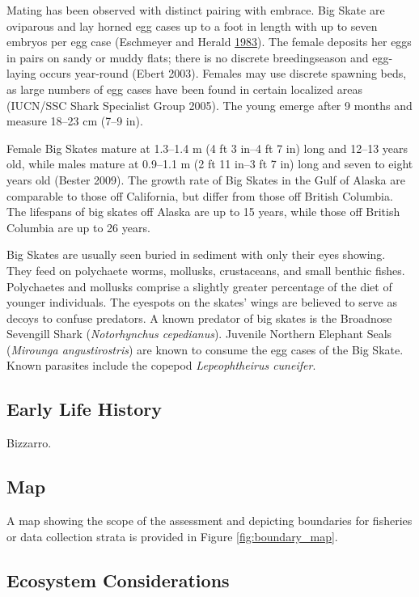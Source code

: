 \documentclass[12pt,]{article}
\begin{document}
Mating has been observed with distinct pairing with embrace. Big Skate
are oviparous and lay horned egg cases up to a foot in length with up to
seven embryos per egg case (Eschmeyer and Herald
\protect\hyperlink{ref-Eschmeyer1983}{1983}). The female deposits her
eggs in pairs on sandy or muddy flats; there is no discrete
breedingseason and egg-laying occurs year-round (Ebert 2003). Females
may use discrete spawning beds, as large numbers of egg cases have been
found in certain localized areas (IUCN/SSC Shark Specialist Group 2005).
The young emerge after 9 months and measure 18--23 cm (7--9 in).

Female Big Skates mature at 1.3--1.4 m (4 ft 3 in--4 ft 7 in) long and
12--13 years old, while males mature at 0.9--1.1 m (2 ft 11 in--3 ft 7
in) long and seven to eight years old (Bester 2009). The growth rate of
Big Skates in the Gulf of Alaska are comparable to those off California,
but differ from those off British Columbia. The lifespans of big skates
off Alaska are up to 15 years, while those off British Columbia are up
to 26 years.

Big Skates are usually seen buried in sediment with only their eyes
showing. They feed on polychaete worms, mollusks, crustaceans, and small
benthic fishes. Polychaetes and mollusks comprise a slightly greater
percentage of the diet of younger individuals. The eyespots on the
skates' wings are believed to serve as decoys to confuse predators. A
known predator of big skates is the Broadnose Sevengill Shark
(\emph{Notorhynchus cepedianus}). Juvenile Northern Elephant Seals
(\emph{Mirounga angustirostris}) are known to consume the egg cases of
the Big Skate. Known parasites include the copepod \emph{Lepeophtheirus
cuneifer}.

\hypertarget{early-life-history}{%
\subsection{Early Life History}\label{early-life-history}}

Bizzarro.

\hypertarget{map}{%
\subsection{Map}\label{map}}

A map showing the scope of the assessment and depicting boundaries for
fisheries or data collection strata is provided in Figure
\ref{fig:boundary_map}.

\hypertarget{ecosystem-considerations-1}{%
\subsection{Ecosystem Considerations}\label{ecosystem-considerations-1}}
\end{document}
